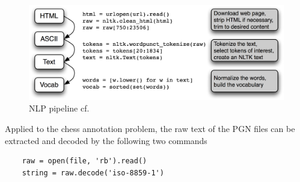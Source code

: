 \documentclass[article,type=msc,colorback,accentcolor=tud7b]{tudthesis}
\begin{document}
    \begin{figure}[H]
      \centering
      \includegraphics{images/nlp_pipeline}
      \caption[NLP pipeline]{NLP pipeline cf.\autocite[Section~3.1]{Bird2009}}
      \label{fig:nlp_pipeline}
    \end{figure}
    
    Applied to the chess annotation problem, the raw text of the PGN files can be extracted and decoded by the following two commands
    
    \lstset{language=Python}
    \begin{lstlisting}
    raw = open(file, 'rb').read()
    string = raw.decode('iso-8859-1')
    \end{lstlisting}
  
\end{document}

